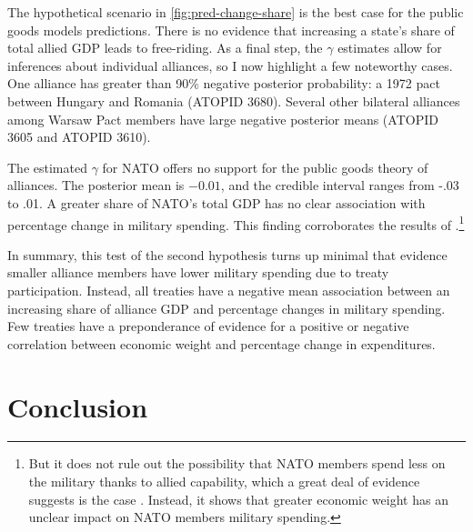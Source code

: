 \documentclass[12pt]{article}
\begin{document}
The hypothetical scenario in \autoref{fig:pred-change-share} is the best case for the public goods models predictions. 
There is no evidence that increasing a state's share of total allied GDP leads to free-riding. 
As a final step, the $\gamma$ estimates allow for inferences about individual alliances, so I now highlight a few noteworthy cases. 
One alliance has greater than 90\% negative posterior probability: a 1972 pact between Hungary and Romania (ATOPID 3680). 
Several other bilateral alliances among Warsaw Pact members have large negative posterior means (ATOPID 3605 and ATOPID 3610). 

 
The estimated $\gamma$ for NATO offers no support for the public goods theory of alliances. 
The posterior mean is $-0.01$, and the credible interval ranges from -.03 to .01.  
A greater share of NATO's total GDP has no clear association with percentage change in military spending. 
This finding corroborates the results of \citet{PluemperNeumayer2015}.\footnote{But it does not rule out the possibility that NATO members spend less on the military thanks to allied capability, which a great deal of evidence suggests is the case \citep{GeorgeSandler2017}. Instead, it shows that greater economic weight has an unclear impact on NATO members military spending.}


In summary, this test of the second hypothesis turns up minimal that evidence smaller alliance members have lower military spending due to treaty participation. 
Instead, all treaties have a negative mean association between an increasing share of alliance GDP and percentage changes in military spending. 
Few treaties have a preponderance of evidence for a positive or negative correlation between economic weight and percentage change in expenditures.   


\section{Conclusion}
\end{document}

